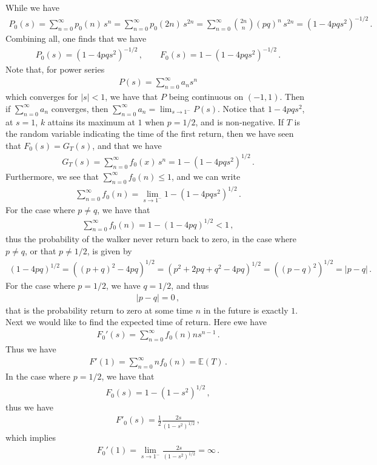 \documentclass[11pt, onesided]{book}
\theoremstyle{break}
\theoremstyle{break}
\begin{document}
While we have
\begin{align*}
P_0(s) = \sum_{n=0}^\infty p_0(n)\,s^n = \sum_{n=0}^\infty p_0(2n) \, s^{2n} = \sum_{n=0}^\infty \binom{2n}{n} (pq)^n\, s^{2n} = (1-4pqs^2)^{-1/2}\,.
\end{align*}
Combining all, one finds that we have
\begin{align*}
P_0(s) = (1-4pqs^2)^{-1/2}\,,\qquad
F_0(s) = 1- (1-4pqs^2)^{-1/2}\,.
\end{align*}
Note that, for power series
\begin{align*}
P(s) = \sum_{n=0}^\infty a_n s^n
\end{align*}
which converges for $|s|<1$, we have that $P$ being continuous on $(-1,1)$. Then if $\sum_{n=0}^\infty a_n$ converges, then $\sum_{n=0}^\infty a_n = \lim_{s\to 1^-} P(s)$.  Notice that $1 - 4pqs^2$, at $s = 1$, $k$ attains its maximum at $1$ when $p = 1/2$, and is non-negative. If $T$ is the random variable indicating the time of the first return, then we have seen that $F_0(s) = G_T(s)$, and that we have
\begin{align*}
G_T(s) = \sum_{n=0}^\infty f_0(x) \, s^n = 1-\left( 1- 4pqs^2\right)^{1/2}\,.
\end{align*}
Furthermore, we see that $\sum_{n=0}^\infty f_0(n)\leq 1$, and we can write
\begin{align*}
\sum_{n=0}^\infty f_0(n) = \lim_{s\to 1^-} 1 - \left( 1 - 4pqs^2\right)^{1/2}\,.
\end{align*}
For the case where $p \neq q$, we have that 
\begin{align*}
\sum_{n=0}^\infty f_0(n) = 1-(1-4pq)^{1/2} <1\,,
\end{align*}
thus the probability of the walker never return back to zero, in the case where $p\neq q$, or that $p\neq 1/2$, is given by
\begin{align*}
(1-4pq)^{1/2} = ( (p+q)^2 -4pq)^{1/2} = (p^2 + 2pq +q^2 -4pq)^{1/2} = ((p-q)^{2})^{1/2} = |p-q|\,.
\end{align*}
For the case where $p = 1/2$, we have $q = 1/2$, and thus
\begin{align*}
|p-q| = 0\,,
\end{align*}
that is the probability return to zero at some time $n$ in the future is exactly $1$. Next we would like to find the expected time of return. Here ewe have
\begin{align*}
F_0'(s) = \sum_{n=0}^\infty f_0(n) ns^{n-1}\,. 
\end{align*}
Thus we have
\begin{align*}
F'(1) = \sum_{n=0}^\infty n f_0(n) = \mathbb{E}(T)\,.
\end{align*}
In the case where $p = 1/2$, we have that 
\begin{align*}
F_0(s) = 1-(1-s^2)^{1/2}\,,
\end{align*}
thus we have
\begin{align*}
F'_0(s) = \frac{1}{2}\frac{2s}{(1-s^2)^{1/2}}\,,
\end{align*}
which implies
\begin{align*}
F_0'(1) = \lim_{s\to 1^-} \frac{2s}{(1-s^2)^{1/2}} = \infty\,.
\end{align*}
\end{document}
